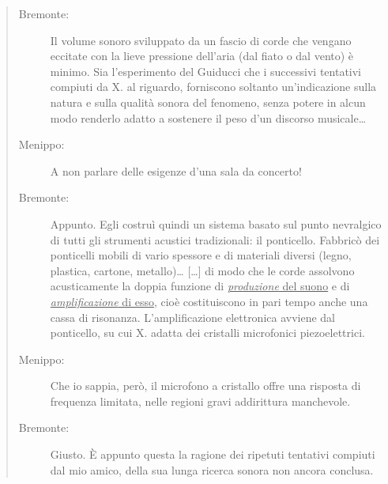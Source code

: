 \begin{quote}
  \begin{sf}
    \small
    \begin{description}
      \item[Bremonte:] Il volume sonoro sviluppato da un fascio di corde che
      vengano eccitate con la lieve pressione dell’aria (dal fiato o dal vento)
      è minimo. Sia l’esperimento del Guiducci che i successivi tentativi
      compiuti da X. al riguardo, forniscono soltanto un’indicazione sulla
      natura e sulla qualità sonora del fenomeno, senza potere in alcun modo
      renderlo adatto a sostenere il peso d’un discorso musicale\ldots
      \item[Menippo:] A non parlare delle esigenze d’una sala da concerto!
      \item[Bremonte:] Appunto. Egli costruì quindi un sistema basato sul punto
      nevralgico di tutti gli strumenti acustici tradizionali: il ponticello.
      Fabbricò dei ponticelli mobili di vario spessore e di materiali diversi
      (legno, plastica, cartone, metallo)\ldots
      [\ldots] di modo che le corde assolvono acusticamente la doppia funzione
      di \underline{\emph{produzione} del suono} e di \underline{\emph{amplificazione} di esso}, cioè costituiscono in
      pari tempo anche una cassa di risonanza. L’amplificazione elettronica
      avviene dal ponticello, su cui X. adatta dei cristalli microfonici
      piezoelettrici.
      \item[Menippo:] Che io sappia, però, il microfono a cristallo offre una
      risposta di frequenza limitata, nelle regioni gravi addirittura manchevole.
      \item[Bremonte:] Giusto. È appunto questa la ragione dei ripetuti
      tentativi compiuti dal mio amico, della sua lunga ricerca sonora non
      ancora conclusa.
    \end{description}
  \end{sf}
\end{quote}

